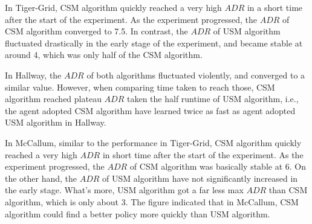 \documentclass{article}
\begin{document}


In Tiger-Grid, CSM algorithm quickly reached a very high $ADR$ in a short
time after the start of the experiment. As the experiment progressed, the $ADR$ of
CSM algorithm converged to 7.5. In contrast, the $ADR$ of USM algorithm fluctuated
drastically in the early stage of the experiment, and became stable at around 4, which
was only half of the CSM algorithm.

In Hallway, the $ADR$ of both algorithms fluctuated violently,  
and converged to a similar value. However, when comparing time taken to reach those,
CSM algorithm reached plateau $ADR$ taken the half runtime of USM algorithm, i.e.,
the agent adopted CSM algorithm have learned twice as fast as agent adopted USM algorithm
in Hallway.

In McCallum, similar to the performance in Tiger-Grid, CSM algorithm quickly reached
a very high $ADR$ in short time after the start of the experiment. As the experiment
progressed, the $ADR$ of CSM algorithm was basically stable at 6. On the other hand,
the $ADR$ of USM algorithm have not significantly increased in the early stage. What's more,
USM algorithm got a far less max $ADR$ than CSM algorithm, which is only about 3. The figure
indicated that in McCallum, CSM algorithm could find a better policy more quickly than USM
algorithm.
\end{document}
